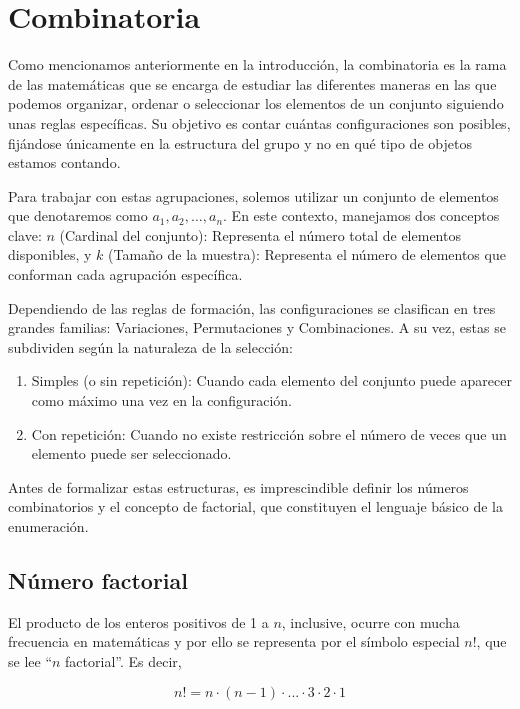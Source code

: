 \documentclass[12pt]{article}
\theoremstyle{definition}
\theoremstyle{plain}
\theoremstyle{plain}
\theoremstyle{definition}
\begin{document}
\section{Combinatoria}
    Como mencionamos anteriormente en la introducción, la combinatoria es la rama de las matemáticas que se encarga de estudiar las diferentes maneras en las que podemos organizar, ordenar o seleccionar los elementos de un conjunto siguiendo unas reglas específicas. Su objetivo es contar cuántas configuraciones son posibles, fijándose únicamente en la estructura del grupo y no en qué tipo de objetos estamos contando. 

    Para trabajar con estas agrupaciones, solemos utilizar un conjunto de elementos que denotaremos como \(a_1,a_2, \dots, a_n\). En este contexto, manejamos dos conceptos clave: \(n\) (Cardinal del conjunto): Representa el número total de elementos disponibles, y \(k\) (Tamaño de la muestra): Representa el número de elementos que conforman cada agrupación específica.

    Dependiendo de las reglas de formación, las configuraciones se clasifican en tres grandes familias: Variaciones, Permutaciones y Combinaciones. A su vez, estas se subdividen según la naturaleza de la selección:

    \begin{enumerate}
        \item Simples (o sin repetición): Cuando cada elemento del conjunto puede aparecer como máximo una vez en la configuración.
        \item Con repetición: Cuando no existe restricción sobre el número de veces que un elemento puede ser seleccionado.
    \end{enumerate}

    Antes de formalizar estas estructuras, es imprescindible definir los números combinatorios y el concepto de factorial, que constituyen el lenguaje básico de la enumeración.

    \subsection{Número factorial}

        El producto de los enteros positivos de 1 a \(n\), inclusive, ocurre con mucha frecuencia en matemáticas y por ello se representa por el símbolo especial \(n!\), que se lee “\(n\) factorial”. Es decir,

        \begin{equation*}
            n! = n \cdot (n-1) \cdot ... \cdot 3 \cdot 2 \cdot 1
        \end{equation*}
\end{document}
